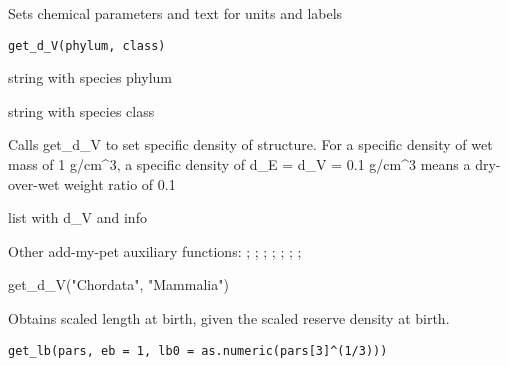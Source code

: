 \documentclass[a4paper]{book}
\begin{document}
%
\begin{Description}\relax
Sets chemical parameters and text for units and labels
\end{Description}
%
\begin{Usage}
\begin{verbatim}
get_d_V(phylum, class)
\end{verbatim}
\end{Usage}
%
\begin{Arguments}
\begin{ldescription}
\item[\code{phylum}] string with species phylum

\item[\code{class}] string with species class
\end{ldescription}
\end{Arguments}
%
\begin{Details}\relax
Calls get\_d\_V to set specific density of structure. For a specific density of wet mass of 1 g/cm\textasciicircum{}3,
a specific density of d\_E = d\_V = 0.1 g/cm\textasciicircum{}3 means a dry-over-wet weight ratio of 0.1
\end{Details}
%
\begin{Value}
list with d\_V and info
\end{Value}
%
\begin{SeeAlso}\relax
Other add-my-pet auxiliary functions: ;
; ;
; ;
;
; 
\end{SeeAlso}
%
\begin{Examples}
\begin{ExampleCode}
get_d_V("Chordata", "Mammalia")
\end{ExampleCode}
\end{Examples}
%
\begin{Description}\relax
Obtains scaled length at birth, given the scaled reserve density at birth.
\end{Description}
%
\begin{Usage}
\begin{verbatim}
get_lb(pars, eb = 1, lb0 = as.numeric(pars[3]^(1/3)))
\end{verbatim}
\end{Usage}
\end{document}
